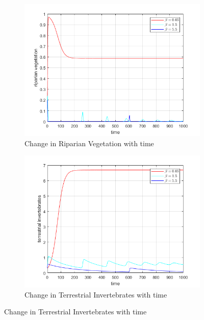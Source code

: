\documentclass[12pt]{article}
\numberwithin{equation}{section}
\begin{document}
\FloatBarrier
\begin{figure}[bp!]
	\centering
        \caption{Variation in parameter $\beta$}
	\begin{subfigure}[t]{0.45\textwidth}
		\centering
	\includegraphics[width=\textwidth]{time_vs_riparian_beta.png}
		\caption{Change in Riparian Vegetation with time} \label{fig:time_vs_riparian_beta}
	\end{subfigure}
\hspace{0.08\textwidth}
        \begin{subfigure}[t]{0.45\textwidth}
                 \centering
         \includegraphics[width=\textwidth]{time_vs_invertebrates_beta.png}
		\caption{Change in Terrestrial Invertebrates with time} \label{fig:time_vs_invertebrates_beta}

\end{subfigure}
\end{figure}
\end{document}
